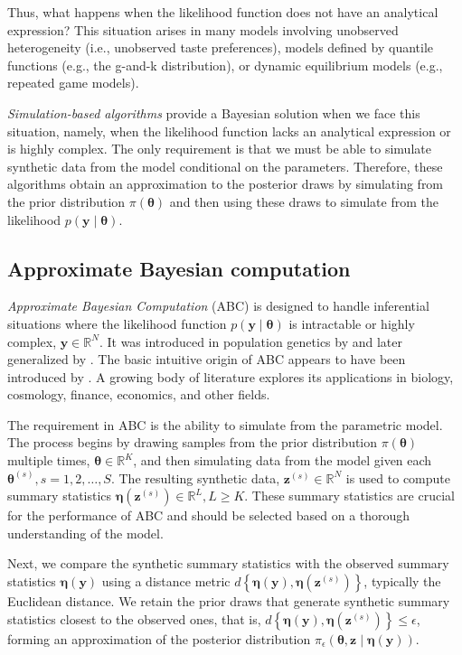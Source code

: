 Thus, what happens when the likelihood function does not have an analytical expression? This situation arises in many models involving unobserved heterogeneity (i.e., unobserved taste preferences), models defined by quantile functions (e.g., the g-and-k distribution), or dynamic equilibrium models (e.g., repeated game models).

\textit{Simulation-based algorithms} provide a Bayesian solution when we face this situation, namely, when the likelihood function lacks an analytical expression or is highly complex. The only requirement is that we must be able to simulate synthetic data from the model conditional on the parameters. Therefore, these algorithms obtain an approximation to the posterior draws by simulating from the prior distribution $\pi(\boldsymbol{\theta})$ and then using these draws to simulate from the likelihood $p(\mathbf{y} \mid \boldsymbol{\theta})$.

\subsection{Approximate Bayesian computation}\label{sec15_12}

\textit{Approximate Bayesian Computation} (ABC) is designed to handle inferential situations where the likelihood function \( p(\boldsymbol{y} \mid \boldsymbol{\theta}) \) is intractable or highly complex, $\boldsymbol{y}\in \mathbb{R}^N$. It was introduced in population genetics by \cite{tavare1997inferring, pritchard1999population} and later generalized by \cite{beaumont2002approximate}. The basic intuitive origin of ABC appears to have been introduced by \cite{rubin1984bayesianly}. A growing body of literature explores its applications in biology, cosmology, finance, economics, and other fields.

The requirement in ABC is the ability to simulate from the parametric model. The process begins by drawing samples from the prior distribution \( \pi({\boldsymbol{\theta}}) \) multiple times, $\boldsymbol{\theta}\in\mathbb{R}^K$, and then simulating data from the model given each \( {\boldsymbol{\theta}^{(s)}}, s=1,2,\dots,S \). The resulting synthetic data, \( \boldsymbol{z}^{(s)} \in \mathbb{R}^N \) is used to compute summary statistics \( \boldsymbol{\eta}(\boldsymbol{z}^{(s)}) \in \mathbb{R}^L, L\geq K \). These summary statistics are crucial for the performance of ABC and should be selected based on a thorough understanding of the model.  

Next, we compare the synthetic summary statistics with the observed summary statistics \( \boldsymbol{\eta}(\boldsymbol{y}) \) using a distance metric \( d\left\{ \boldsymbol\eta ({\boldsymbol y}),{\boldsymbol \eta }({\boldsymbol z}^{(s)})\right\} \), typically the Euclidean distance. We retain the prior draws that generate synthetic summary statistics closest to the observed ones, that is, \( d\left\{ \boldsymbol\eta ({\boldsymbol y}),{\boldsymbol \eta }({\boldsymbol z}^{(s)})\right\}\leq \epsilon \), forming an approximation of the posterior distribution \( \pi_{\epsilon}(\boldsymbol{\theta},\boldsymbol{z} \mid \boldsymbol{\eta}(\boldsymbol{y})) \).

